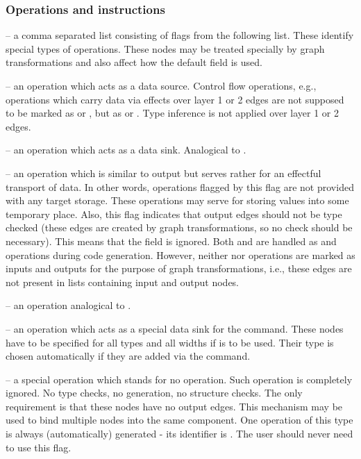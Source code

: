 \subsubsection{Operations and instructions}
  \begin{description}
    \item {} -- a comma separated list consisting of flags from the following list. These identify special types of operations. These nodes may be treated specially by graph transformations and also affect how the default  field is used.  
  \begin{description}
    \item {} -- an operation which acts as a data source. Control flow operations, e.g., operations which carry data via effects over layer 1 or 2 edges are not supposed to be marked as  or , but as  or . Type inference is not applied over layer 1 or 2 edges.
    \item {} -- an operation which acts as a data sink. Analogical to .
    \item {} -- an operation which is similar to output but serves rather for an effectful transport of data. In other words, operations flagged by this flag are not provided with any target storage. These operations may serve for storing values into some temporary place. Also, this flag indicates that output edges should not be type checked (these edges are created by graph transformations, so no check should be necessary). This means that the  field is ignored. Both  and  are handled as  and  operations during code generation. However, neither  nor  operations are marked as inputs and outputs for the purpose of graph transformations, i.e., these edges are not present in lists containing input and output nodes.
    \item {} -- an operation analogical to . 
    \item {} -- an operation which acts as a special data sink for the  command. These nodes have to be specified for all types and all widths if  is to be used. Their type is chosen automatically if they are added via the  command.
    \item {} -- a special operation which stands for no operation. Such operation is completely ignored. No type checks, no generation, no structure checks. The only requirement is that these nodes have no output edges. This mechanism may be used to bind multiple nodes into the same component. One operation of this type is always (automatically) generated - its identifier is . The user should never need to use this flag.

\end{description}
\end{description}
